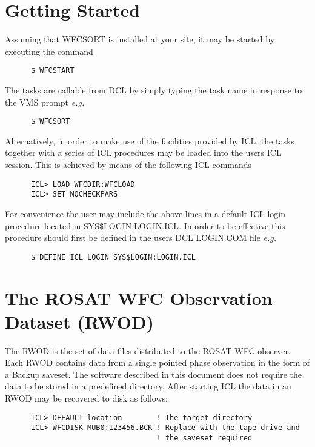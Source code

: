 \section{Getting Started}
Assuming that WFCSORT is installed at your site, it may be started 
by executing the command

\begin{verbatim}
      $ WFCSTART
\end{verbatim}

The tasks are callable from DCL by simply typing the 
task name in response to the VMS prompt {\em e.g.}

\begin{verbatim}
      $ WFCSORT
\end{verbatim}

Alternatively, in order to make use of the facilities provided by ICL,
the tasks together with a series of ICL procedures may be
loaded into the users ICL session. This is achieved by means of the following
ICL commands

\begin{verbatim}
      ICL> LOAD WFCDIR:WFCLOAD
      ICL> SET NOCHECKPARS
\end{verbatim}

For convenience the user may include the above lines in a default ICL
login procedure located in SYS\$LOGIN:LOGIN.ICL. In order to be effective
this procedure should first be defined in the users DCL LOGIN.COM file {\em
e.g.}

\begin{verbatim}
      $ DEFINE ICL_LOGIN SYS$LOGIN:LOGIN.ICL
\end{verbatim}

\section{The ROSAT WFC Observation Dataset (RWOD)}
 
The RWOD is the set of data files distributed to the ROSAT WFC observer. Each
RWOD contains data from a single pointed phase observation in the form of a
Backup saveset. The software  described in this document does not require the
data to be stored in a  predefined directory. After starting ICL the data in an
RWOD may be recovered to disk as follows:

\begin{verbatim}
      ICL> DEFAULT location        ! The target directory
      ICL> WFCDISK MUB0:123456.BCK ! Replace with the tape drive and 
                                   ! the saveset required
\end{verbatim}

